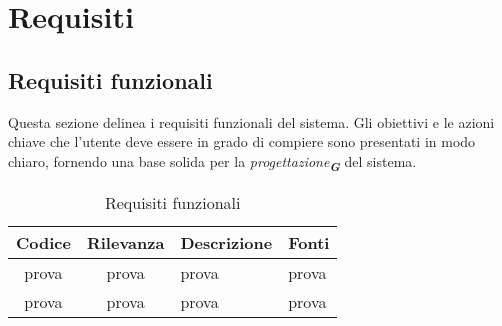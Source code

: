 
\section{Requisiti}
\label{sec:Requisiti}

\subsection{Requisiti funzionali}
Questa sezione delinea i requisiti funzionali del sistema. Gli obiettivi e le azioni chiave che
l'utente deve essere in grado di compiere sono presentati in modo chiaro, fornendo una base
solida per la \emph{progettazione}\textsubscript{\textit{\textbf{G}}} del sistema.
    \begin{table}[h!]
        \centering
        \renewcommand{\arraystretch}{1.6} %
        \begin{tabularx}{\textwidth}{|>{\centering\arraybackslash}c|>{\centering\arraybackslash}c|>{\centering\arraybackslash}X|>{\centering\arraybackslash}p{3cm}|} \hline
        \rowcolor[HTML]{FFD700} 
        \textbf{Codice} & \textbf{Rilevanza} & \textbf{Descrizione} & \textbf{Fonti} \\ \hline
        prova & prova & prova & prova \\ \hline
        prova & prova & prova & prova \\ \hline
        \end{tabularx}
        \caption{Requisiti funzionali}
        \label{tab:Requisiti_funzionali}
    \end{table}
    


